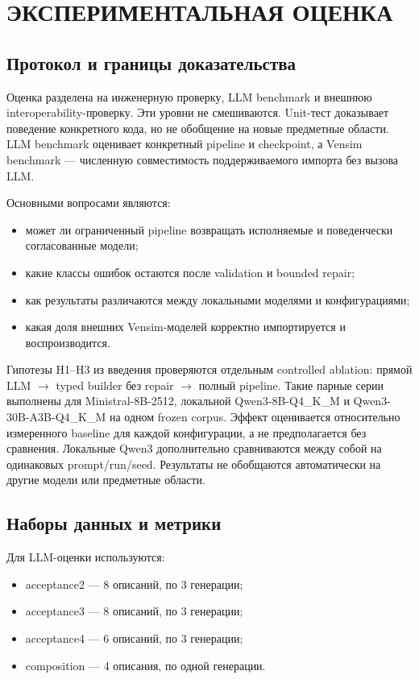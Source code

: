\chapter{ЭКСПЕРИМЕНТАЛЬНАЯ ОЦЕНКА}

\section{Протокол и границы доказательства}

Оценка разделена на инженерную проверку, LLM benchmark и внешнюю interoperability-проверку. Эти уровни не смешиваются. Unit-тест доказывает поведение конкретного кода, но не обобщение на новые предметные области. LLM benchmark оценивает конкретный pipeline и checkpoint, а Vensim benchmark --- численную совместимость поддерживаемого импорта без вызова LLM.

Основными вопросами являются:

\begin{itemize}
    \item может ли ограниченный pipeline возвращать исполняемые и поведенчески согласованные модели;
    \item какие классы ошибок остаются после validation и bounded repair;
    \item как результаты различаются между локальными моделями и конфигурациями;
    \item какая доля внешних Vensim-моделей корректно импортируется и воспроизводится.
\end{itemize}

Гипотезы H1--H3 из введения проверяются отдельным controlled ablation: прямой LLM $\rightarrow$ typed builder без repair $\rightarrow$ полный pipeline. Такие парные серии выполнены для Ministral-8B-2512, локальной Qwen3-8B-Q4\_K\_M и Qwen3-30B-A3B-Q4\_K\_M на одном frozen corpus. Эффект оценивается относительно измеренного baseline для каждой конфигурации, а не предполагается без сравнения. Локальные Qwen3 дополнительно сравниваются между собой на одинаковых prompt/run/seed. Результаты не обобщаются автоматически на другие модели или предметные области.

\section{Наборы данных и метрики}

Для LLM-оценки используются:

\begin{itemize}
    \item acceptance2 --- 8 описаний, по 3 генерации;
    \item acceptance3 --- 8 описаний, по 3 генерации;
    \item acceptance4 --- 6 описаний, по 3 генерации;
    \item composition --- 4 описания, по одной генерации.
\end{itemize}

